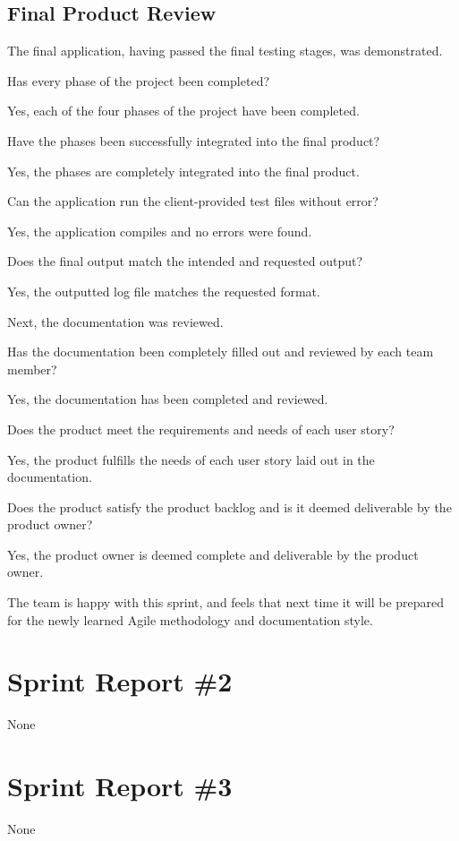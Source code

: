 \subsection{Final Product Review}

The final application, having passed the final testing stages, was demonstrated.  \\
\begin{description}
\item [$\bullet$] Has every phase of the project been completed? 
\item Yes, each of the four phases of the project have been completed.
\item [$\bullet$]Have the phases been successfully integrated into the final product?
\item Yes, the phases are completely integrated into the final product.
\item [$\bullet$] Can the application run the client-provided test files without error?
\item Yes, the application compiles and no errors were found.
\item [$\bullet$] Does the final output match the intended and requested output?
\item Yes, the outputted log file matches the requested format.\\

\item Next, the documentation was reviewed. \\

\item [$\bullet$] Has the documentation been completely filled out and reviewed by each team member?
\item Yes, the documentation has been completed and reviewed. 
\item [$\bullet$] Does the product meet the requirements and needs of each user story?
\item Yes, the product fulfills the needs of each user story laid out in the documentation.
\item [$\bullet$] Does the product satisfy the product backlog and is it deemed deliverable by the product owner?
\item Yes, the product owner is deemed complete and deliverable by the product owner.\\

\item The team is happy with this sprint, and feels that next time it will be prepared for the newly learned Agile methodology and documentation style.\\
\end{description}

\section{Sprint Report \#2}
None

\section{Sprint Report \#3}
None